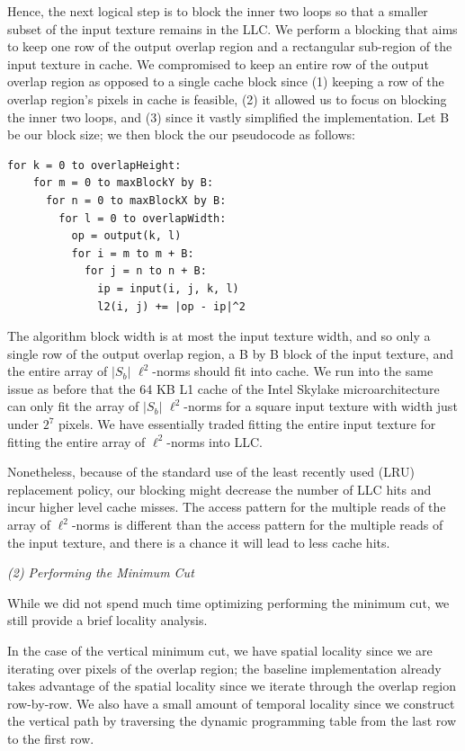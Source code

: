 \documentclass[letterpaper]{article}
\newcommand{\inline}[1]{{\ttfamily\hyphenchar\font=45 #1}}
\begin{document}
Hence, the next logical step is to block the inner two loops so that a smaller subset of the input texture remains in the LLC. We perform a blocking that aims to keep one row of the output overlap region and a rectangular sub-region of the input texture in cache. We compromised to keep an entire row of the output overlap region as opposed to a single cache block since (1) keeping a row of the overlap region's pixels in cache is feasible, (2) it allowed us to focus on  blocking the inner two loops, and (3) since it vastly simplified the implementation. Let \inline{B} be our block size; we then block the our pseudocode as follows:

\begin{lstlisting}[style=cppstyle]
  for k = 0 to overlapHeight:
    for m = 0 to maxBlockY by B:
      for n = 0 to maxBlockX by B:
        for l = 0 to overlapWidth:
          op = output(k, l)
          for i = m to m + B:
            for j = n to n + B:
              ip = input(i, j, k, l)
              l2(i, j) += |op - ip|^2
\end{lstlisting}

The algorithm block width is at most the input texture width, and so only a single row of the output overlap region, a \inline{B} by \inline {B} block of the input texture, and the entire array of $|S_b|$ $\ell ^2$-norms should fit into cache. We run into the same issue as before that the 64 KB L1 cache of the Intel Skylake microarchitecture can only fit the array of $|S_b|$  $\ell ^2$-norms for a square input texture with width just under $2^7$ pixels. We have essentially traded fitting the entire input texture for fitting the entire array of $\ell ^2$-norms into LLC.

Nonetheless, because of the standard use of the least recently used (LRU) replacement policy, our blocking might decrease the number of LLC hits and incur higher level cache misses. The access pattern for the multiple reads of the array of $\ell ^2$-norms is different than the access pattern for the multiple reads of the input texture, and there is a chance it will lead to less cache hits.

\textit{(2) Performing the Minimum Cut}

While we did not spend much time optimizing performing the minimum cut, we still provide a brief locality analysis.

In the case of the vertical minimum cut, we have spatial locality since we are iterating over pixels of the overlap region; the baseline implementation already takes advantage of the spatial locality since we iterate through the overlap region row-by-row. We also have a small amount of temporal locality since we construct the vertical path by traversing the dynamic programming table from the last row to the first row.
\end{document}
